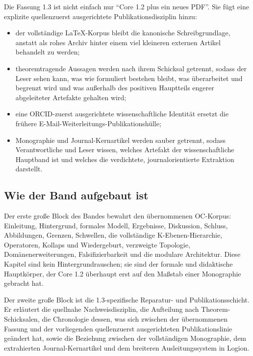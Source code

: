 Die Fassung 1.3 ist nicht einfach nur ``Core 1.2 plus ein neues PDF''.
Sie fügt eine explizite quellenzuerst ausgerichtete Publikationsdisziplin hinzu:

\begin{itemize}
\item der vollständige LaTeX-Korpus bleibt die kanonische Schreibgrundlage, anstatt als
      rohes Archiv hinter einem viel kleineren externen Artikel behandelt zu werden;
\item theoremtragende Aussagen werden nach ihrem Schicksal getrennt, sodass der Leser sehen kann,
      was wie formuliert bestehen bleibt, was überarbeitet und begrenzt wird und was außerhalb des
      positiven Hauptteils engerer abgeleiteter Artefakte gehalten wird;
\item eine ORCID-zuerst ausgerichtete wissenschaftliche Identität ersetzt die frühere
      E-Mail-Weiterleitungs-Publikationshülle;
\item Monographie und Journal-Kernartikel werden sauber getrennt, sodass Verantwortliche und
      Leser wissen, welches Artefakt der wissenschaftliche Hauptband ist und welches die
      verdichtete, journalorientierte Extraktion darstellt.
\end{itemize}

\subsection{Wie der Band aufgebaut ist}

Der erste große Block des Bandes bewahrt den übernommenen OC-Korpus: Einleitung, Hintergrund,
formales Modell, Ergebnisse, Diskussion, Schluss, Abbildungen, Grenzen, Schwellen, die
vollständige K-Ebenen-Hierarchie, Operatoren, Kollaps und Wiedergeburt, verzweigte Topologie,
Domänenerweiterungen, Falsifizierbarkeit und die modulare Architektur. Diese Kapitel sind kein
Hintergrundrauschen; sie sind der formale und didaktische Hauptkörper, der Core 1.2 überhaupt erst
auf den Maßstab einer Monographie gebracht hat.

Der zweite große Block ist die 1.3-spezifische Reparatur- und Publikationsschicht.
Er erläutert die quellnahe Nachweisdisziplin, die Aufteilung nach Theorem-Schicksalen, die
Chronologie dessen, was sich zwischen der übernommenen Fassung und der vorliegenden
quellenzuerst ausgerichteten Publikationslinie geändert hat, sowie die Beziehung zwischen der
vollständigen Monographie, dem extrahierten Journal-Kernartikel und dem breiteren
Ausleitungssystem in Logion.

